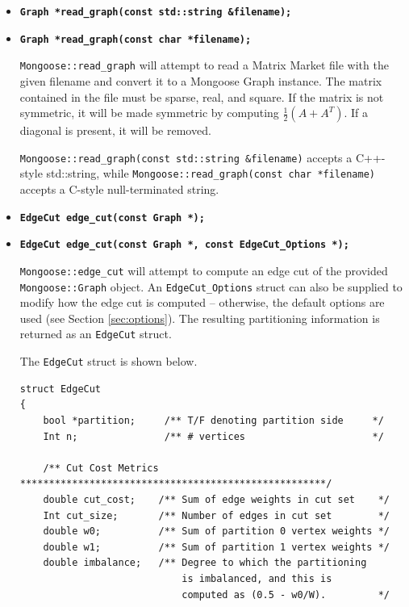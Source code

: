 \documentclass[letter]{article}
\begin{document}
\begin{itemize}
\item \textbf{\texttt{Graph *read\_graph(const std::string \&filename);}} \vspace{-6pt}
\item \textbf{\texttt{Graph *read\_graph(const char *filename);}}

\texttt{Mongoose::read\_graph} will attempt to read a Matrix Market file with the given filename and convert it to a Mongoose Graph instance. The matrix contained in the file must be sparse, real, and square. If the matrix is not symmetric, it will be made symmetric by computing $\frac{1}{2}(A+A^T)$. If a diagonal is present, it will be removed.

\texttt{Mongoose::read\_graph(const std::string \&filename)} accepts a C++-style std::string, while \texttt{Mongoose::read\_graph(const char *filename)} accepts a C-style null-terminated string.
\vspace{6pt}
\item \textbf{\texttt{EdgeCut edge\_cut(const Graph *);}} \vspace{-6pt}
\item \textbf{\texttt{EdgeCut edge\_cut(const Graph *, const EdgeCut\_Options *);}}

\texttt{Mongoose::edge\_cut} will attempt to compute an edge cut of the provided \texttt{Mongoose::Graph} object. An \texttt{EdgeCut\_Options} struct can also be supplied to modify how the edge cut is computed -- otherwise, the default options are used (see Section \ref{sec:options}). The resulting partitioning information is returned as an \texttt{EdgeCut} struct.

The \texttt{EdgeCut} struct is shown below.

\begin{lstlisting}
struct EdgeCut
{
    bool *partition;     /** T/F denoting partition side     */
    Int n;               /** # vertices                      */

    /** Cut Cost Metrics *****************************************************/
    double cut_cost;    /** Sum of edge weights in cut set    */
    Int cut_size;       /** Number of edges in cut set        */
    double w0;          /** Sum of partition 0 vertex weights */
    double w1;          /** Sum of partition 1 vertex weights */
    double imbalance;   /** Degree to which the partitioning
                            is imbalanced, and this is
                            computed as (0.5 - w0/W).         */


\end{lstlisting}
\end{itemize}
\end{document}
